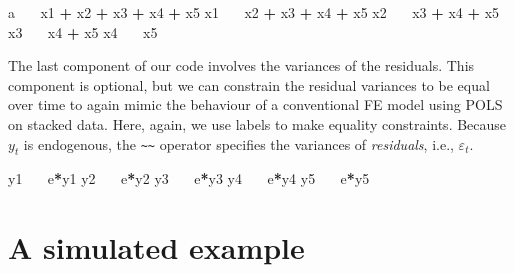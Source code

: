 \documentclass[
  12pt,
  a4paper]{article}
\newenvironment{Shaded}{\begin{snugshade}}{\end{snugshade}}
\newcommand{\ErrorTok}[1]{\textcolor[rgb]{0.64,0.00,0.00}{\textbf{#1}}}
\newcommand{\NormalTok}[1]{#1}
\newcommand{\OperatorTok}[1]{\textcolor[rgb]{0.81,0.36,0.00}{\textbf{#1}}}
\newcommand{\StringTok}[1]{\textcolor[rgb]{0.31,0.60,0.02}{#1}}
\begin{document}
\singlespacing

\begin{Shaded}
\begin{Highlighting}[]
\NormalTok{a }\OperatorTok{~}\ErrorTok{~}\StringTok{ }\NormalTok{x1 }\OperatorTok{+}\StringTok{ }\NormalTok{x2 }\OperatorTok{+}\StringTok{ }\NormalTok{x3 }\OperatorTok{+}\StringTok{ }\NormalTok{x4 }\OperatorTok{+}\StringTok{ }\NormalTok{x5}
\NormalTok{x1 }\OperatorTok{~}\ErrorTok{~}\StringTok{ }\NormalTok{x2 }\OperatorTok{+}\StringTok{ }\NormalTok{x3 }\OperatorTok{+}\StringTok{ }\NormalTok{x4 }\OperatorTok{+}\StringTok{ }\NormalTok{x5}
\NormalTok{x2 }\OperatorTok{~}\ErrorTok{~}\StringTok{ }\NormalTok{x3 }\OperatorTok{+}\StringTok{ }\NormalTok{x4 }\OperatorTok{+}\StringTok{ }\NormalTok{x5}
\NormalTok{x3 }\OperatorTok{~}\ErrorTok{~}\StringTok{ }\NormalTok{x4 }\OperatorTok{+}\StringTok{ }\NormalTok{x5}
\NormalTok{x4 }\OperatorTok{~}\ErrorTok{~}\StringTok{ }\NormalTok{x5}
\end{Highlighting}
\end{Shaded}

\doublespacing

The last component of our code involves the variances of the residuals.
This component is optional, but we can constrain the residual variances
to be equal over time to again mimic the behaviour of a conventional FE
model using POLS on stacked data. Here, again, we use labels to make
equality constraints. Because \(y_{t}\) is endogenous, the
\texttt{\textasciitilde{}\textasciitilde{}} operator specifies the
variances of \emph{residuals}, i.e., \(\varepsilon_{t}\).

\singlespacing

\begin{Shaded}
\begin{Highlighting}[]
\NormalTok{y1 }\OperatorTok{~}\ErrorTok{~}\StringTok{ }\NormalTok{e}\OperatorTok{*}\NormalTok{y1}
\NormalTok{y2 }\OperatorTok{~}\ErrorTok{~}\StringTok{ }\NormalTok{e}\OperatorTok{*}\NormalTok{y2}
\NormalTok{y3 }\OperatorTok{~}\ErrorTok{~}\StringTok{ }\NormalTok{e}\OperatorTok{*}\NormalTok{y3}
\NormalTok{y4 }\OperatorTok{~}\ErrorTok{~}\StringTok{ }\NormalTok{e}\OperatorTok{*}\NormalTok{y4}
\NormalTok{y5 }\OperatorTok{~}\ErrorTok{~}\StringTok{ }\NormalTok{e}\OperatorTok{*}\NormalTok{y5}
\end{Highlighting}
\end{Shaded}

\doublespacing

\hypertarget{ex1}{%
\section{A simulated example}\label{ex1}}
\end{document}
